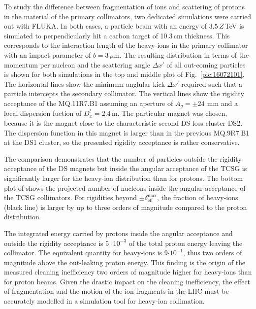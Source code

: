 To study the difference between fragmentation of  \lead ions and scattering of protons in the material of the primary collimators, two dedicated simulations were carried out with FLUKA. In both cases, a particle beam with an energy of $3.5\,Z\,$TeV is simulated to perpendicularly hit a carbon target of 10.3$\,$cm thickness. This corresponds to the interaction length of the heavy-ions in the primary collimator with an impact parameter of $b=3\,\mu$m. The resulting distribution in terms of the momentum per nucleon and the scattering angle $\Delta x'$ of all out-coming particles is shown for both simulations in the top and middle plot of Fig.~\ref{pic:16072101}. The horizontal lines show the minimum anglular kick $\Delta x'$ required such that a particle intercepts the secondary collimator. The vertical lines show the rigidity acceptance of the MQ.11R7.B1 assuming an aperture of $A_g = \pm 24~\,$mm and a local dispersion fuction of $D_x^l = 2.4\,$m. The particular magnet was chosen, because it is the magnet close to the characteristic second DS loss cluster DS2. The dispersion function in this magnet is larger than in the previous MQ.9R7.B1 at the DS1 cluster, so the presented rigidity acceptance is rather conservative. 

The comparison demonstrates that the number of particles outside the rigidity acceptance of the DS magnets but inside the angular acceptance of the TCSG is significantly larger for the heavy-ion distribution than for protons. The bottom plot of  shows the projected number of nucleons inside the angular acceptance of the TCSG collimators. For rigidities beyond $\pm \delta_\text{eff}^\text{max}$, the fraction of heavy-ions (black line) is larger by up to three orders of magnitude compared to the proton distribution. 

The integrated energy carried by protons inside the angular acceptance and outside the rigidity acceptance is $5 \cdot 10^{-3}$ of the total proton energy leaving the collimator. The equivalent quantity for heavy-ions is 9$\cdot 10^{-1}$, thus two orders of magnitude above the out-leaking proton energy. This finding is the origin of the measured cleaning inefficiency two orders of magnitude higher for heavy-ions than for proton beams. Given the drastic impact on the cleaning inefficiency, the effect of fragmentation and the motion of the ion fragments in the LHC must be accurately modelled in a simulation tool for heavy-ion collimation.





